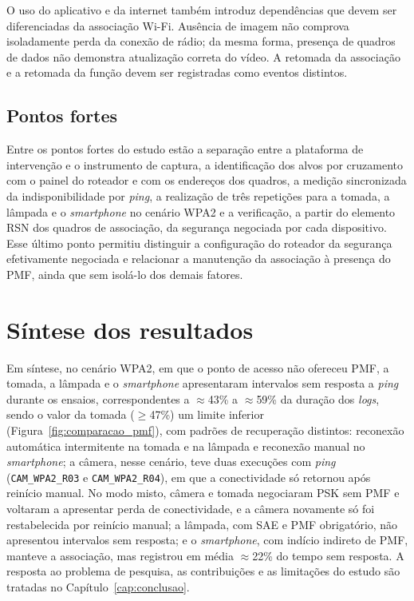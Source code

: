 O uso do aplicativo e da internet também introduz dependências que devem ser diferenciadas da associação Wi-Fi. Ausência de imagem não comprova isoladamente perda da conexão de rádio; da mesma forma, presença de quadros de dados não demonstra atualização correta do vídeo. A retomada da associação e a retomada da função devem ser registradas como eventos distintos.

\subsection{Pontos fortes}

Entre os pontos fortes do estudo estão a separação entre a plataforma de intervenção e o instrumento de captura, a identificação dos alvos por cruzamento com o painel do roteador e com os endereços dos quadros, a medição sincronizada da indisponibilidade por \textit{ping}, a realização de três repetições para a tomada, a lâmpada e o \textit{smartphone} no cenário WPA2 e a verificação, a partir do elemento RSN dos quadros de associação, da segurança negociada por cada dispositivo. Esse último ponto permitiu distinguir a configuração do roteador da segurança efetivamente negociada e relacionar a manutenção da associação à presença do PMF, ainda que sem isolá-lo dos demais fatores.

\section{Síntese dos resultados}
\label{sec:sintese_resultados}

Em síntese, no cenário WPA2, em que o ponto de acesso não ofereceu PMF, a tomada, a lâmpada e o \textit{smartphone} apresentaram intervalos sem resposta a \textit{ping} durante os ensaios, correspondentes a $\approx$43\% a $\approx$59\% da duração dos \textit{logs}, sendo o valor da tomada ($\geq$47\%) um limite inferior (Figura~\ref{fig:comparacao_pmf}), com padrões de recuperação distintos: reconexão automática intermitente na tomada e na lâmpada e reconexão manual no \textit{smartphone}; a câmera, nesse cenário, teve duas execuções com \textit{ping} (\texttt{CAM\_WPA2\_R03} e \texttt{CAM\_WPA2\_R04}), em que a conectividade só retornou após reinício manual. No modo misto, câmera e tomada negociaram PSK sem PMF e voltaram a apresentar perda de conectividade, e a câmera novamente só foi restabelecida por reinício manual; a lâmpada, com SAE e PMF obrigatório, não apresentou intervalos sem resposta; e o \textit{smartphone}, com indício indireto de PMF, manteve a associação, mas registrou em média $\approx$22\% do tempo sem resposta. A resposta ao problema de pesquisa, as contribuições e as limitações do estudo são tratadas no Capítulo~\ref{cap:conclusao}.
